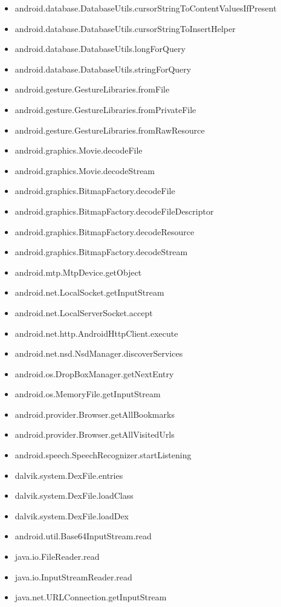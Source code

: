 \documentclass{sig-alternate}
\begin{document}
\begin{itemize}
\item android.database.DatabaseUtils.cursorStringToContentValuesIfPresent
\item android.database.DatabaseUtils.cursorStringToInsertHelper
\item android.database.DatabaseUtils.longForQuery
\item android.database.DatabaseUtils.stringForQuery
\item android.gesture.GestureLibraries.fromFile
\item android.gesture.GestureLibraries.fromPrivateFile
\item android.gesture.GestureLibraries.fromRawResource
\item android.graphics.Movie.decodeFile
\item android.graphics.Movie.decodeStream
\item android.graphics.BitmapFactory.decodeFile
\item android.graphics.BitmapFactory.decodeFileDescriptor
\item android.graphics.BitmapFactory.decodeResource
\item android.graphics.BitmapFactory.decodeStream
\item android.mtp.MtpDevice.getObject
\item android.net.LocalSocket.getInputStream
\item android.net.LocalServerSocket.accept
\item android.net.http.AndroidHttpClient.execute
\item android.net.nsd.NsdManager.discoverServices
\item android.os.DropBoxManager.getNextEntry
\item android.os.MemoryFile.getInputStream
\item android.provider.Browser.getAllBookmarks
\item android.provider.Browser.getAllVisitedUrls
\item android.speech.SpeechRecognizer.startListening
\item dalvik.system.DexFile.entries
\item dalvik.system.DexFile.loadClass
\item dalvik.system.DexFile.loadDex
\item android.util.Base64InputStream.read
\item java.io.FileReader.read
\item java.io.InputStreamReader.read
\item java.net.URLConnection.getInputStream

\end{itemize}
\end{document}
